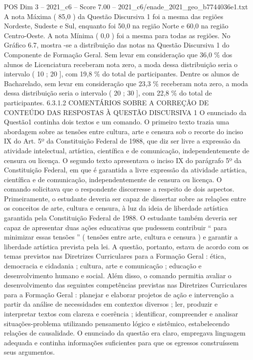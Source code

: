 \begin{textsample}{POS Dim 3 – 2021\_c6 – Score 7.00 – 2021\_c6/enade\_2021\_geo\_b7744036e1.txt}
A nota Máxima ( 85,0 ) da Questão Discursiva 1 foi a mesma das regiões Nordeste, Sudeste e Sul, enquanto foi 50,0 na região Norte e 60,0 na região Centro-Oeste.
A nota Mínima ( 0,0 ) foi a mesma para todas as regiões.
No Gráfico 6.7, mostra -se a distribuição das notas na Questão Discursiva 1 do Componente de Formação Geral.
Sem levar em consideração que 36,0 \% dos alunos de Licenciatura receberam nota zero, a moda dessa distribuição seria o intervalo ( 10 ; 20 ], com 19,8 \% do total de participantes.
Dentre os alunos de Bacharelado, sem levar em consideração que 23,3 \% receberam nota zero, a moda dessa distribuição seria o intervalo ( 20 ; 30 ], com 22,8 \% do total de participantes. 6.3.1.2 COMENTÁRIOS SOBRE A CORREÇÃO DE CONTEÚDO DAS RESPOSTAS À QUESTÃO DISCURSIVA 1 O enunciado da Questão1 continha dois textos e um comando.
O primeiro texto trazia uma abordagem sobre as tensões entre cultura, arte e censura sob o recorte do inciso IX do Art. 5º da Constituição Federal de 1988, que diz ser livre a expressão da atividade intelectual, artística, científica e de comunicação, independentemente de censura ou licença.
O segundo texto apresentava o inciso IX do parágrafo 5º da Constituição Federal, em que é garantida a livre expressão da atividade artística, científica e de comunicação, independentemente de censura ou licença.
O comando solicitava que o respondente discorresse a respeito de dois aspectos.
Primeiramente, o estudante deveria ser capaz de dissertar sobre as relações entre os conceitos de arte, cultura e censura, à luz da ideia de liberdade artística garantida pela Constituição Federal de 1988.
O estudante também deveria ser capaz de apresentar duas ações educativas que pudessem contribuir “ para minimizar essas tensões ” ( tensões entre arte, cultura e censura ) e garantir a liberdade artística prevista pela lei.
A questão, portanto, estava de acordo com os temas previstos nas Diretrizes Curriculares para a Formação Geral : ética, democracia e cidadania ; cultura, arte e comunicação ; educação e desenvolvimento humano e social.
Além disso, o comando permitia avaliar o desenvolvimento das seguintes competências previstas nas Diretrizes Curriculares para a Formação Geral : planejar e elaborar projetos de ação e intervenção a partir da análise de necessidades em contextos diversos ; ler, produzir e interpretar textos com clareza e coerência ; identificar, compreender e analisar situações-problema utilizando pensamento lógico e sistêmico, estabelecendo relações de causalidade.
O enunciado da questão era claro, empregava linguagem adequada e continha informações suficientes para que os egressos construíssem seus argumentos.

\end{textsample}
